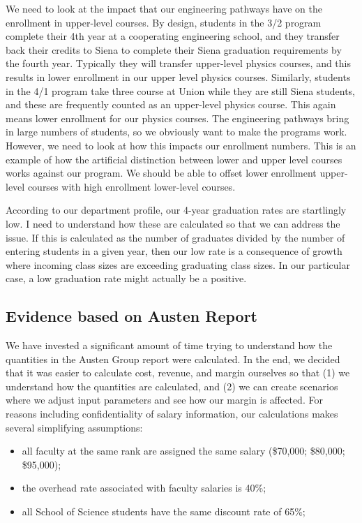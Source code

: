 \documentclass[12pt]{article}
\begin{document}
We need to look at the impact that our engineering pathways have on the enrollment in upper-level courses.  By design, students in the 3/2 program complete their 4th year at a cooperating engineering school, and they transfer back their credits to Siena to complete their Siena graduation requirements by the fourth year.  Typically they will transfer upper-level physics courses, and this results in lower enrollment in our upper level physics courses.  Similarly, students in the 4/1 program take three course at Union while they are still Siena students, and these are frequently counted as an upper-level physics course.  This again means lower enrollment for our physics courses.  The engineering pathways bring in large numbers of students, so we obviously want to make the programs work.  However, we need to look at how this impacts our enrollment numbers.  This is an example of how the artificial distinction between lower and upper level courses works against our program.  We should be able to offset lower enrollment upper-level courses with high enrollment lower-level courses.

According to our department profile, our 4-year graduation rates are startlingly low.  I need to understand how these are calculated so that we can address the issue.  If this is calculated as the number of graduates divided by the number of entering students in a given year, then our low rate is a consequence of growth where incoming class sizes are exceeding graduating class sizes. In our particular case, a low graduation rate might actually be a positive.

\subsection{Evidence based on Austen Report}
We have invested a significant amount of time trying to understand how the quantities in the Austen Group report were calculated.  In the end, we decided that it was easier to calculate cost, revenue, and margin ourselves so that (1) we understand how the quantities are calculated, and (2) we can create scenarios where we adjust input parameters and see how  our margin is affected.   For reasons including confidentiality of salary information, our calculations makes several simplifying assumptions:
\begin{itemize}
\item all faculty at the same rank are assigned the same salary (\$70,000; \$80,000; \$95,000);
\item the overhead rate associated with faculty salaries is 40\%;
\item all School of Science students have the same discount rate of 65\%;
\end{itemize}
\end{document}
